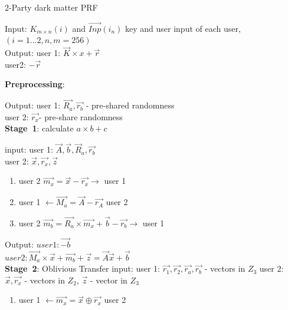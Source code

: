 \begin{algorithm}
	\caption{2-Party dark matter PRF}
	\label{2PartyDarkMatter}
	
	
	Input: ${K_{m\times n} }(i)$ and $\vec{Inp}(i_n)$ key and user input of each user,\\
	$(i = 1...2, n,m = 256)$\\ 
	Output: user 1: $\vec{K} \times x + \vec{r}$\\
	user2: $-  \vec{r}$\\   %
	
	\begin{algorithmic}
		
		\STATE \textbf{Preprocessing}:
		
		Output: 	user 1: $\vec{R_a}, \vec{r_b}$ - pre-shared randomness \\
		user 2: $\vec{r_x} $- pre-share randomness \\
		
		\STATE  \textbf{Stage\ 1}: calculate $a \times b \plus c$
		
		input: user 1: ${\vec{A}, \vec{b}, {\vec R_a}, \vec{r_b} } $ \\
		user 2: ${\vec{x}, \vec{r_x},  \vec{z} }$ \\
		
		\begin{enumerate}
			
			\item user 2 $\vec{m_x} = \vec{x} -\vec{r_x}  \rightarrow  $  user 1
			
			\item user 1  $ \leftarrow   \vec{M_a} =  \vec{A} - \vec{r_A}   $ user 2
			
			\item user 2 $ \vec{m_b} = \vec{R_a} \times \vec{m_x} + \vec{b}  - \vec{r_b}  \rightarrow $ user 1
		\end{enumerate}
		
		Output: $user 1: \vec{- b} $  \\
		$user 2: \vec{M_a} \times \vec{x} + \vec{m_b} + \vec{z} = \vec{A} \vec{x} + \vec{b}$ \\
		
		\STATE  \textbf{Stage\ 2}: Oblivious Transfer
		input: 	 user 1:  $\vec{r_1}, \vec{r_2}, \vec{r_a}, \vec{r_b}$ - vectors in $Z_3$
		user 2:  $\vec{x}, \vec{r_x}$ - vectors in $Z_2$, $\vec{z} $ - vector in $Z_3$
		
		
		\begin{enumerate}
			\item user 1  $ \leftarrow   \vec{m_x} = \vec{x} \oplus \vec{r_x}$   user 2
			

\end{enumerate}
\end{algorithmic}
\end{algorithm}
